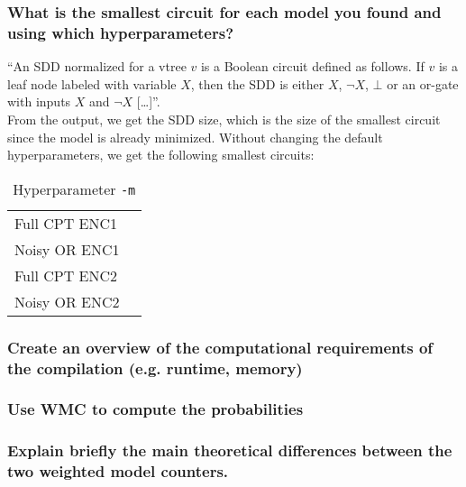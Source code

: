 \documentclass{article}
\begin{document}
\subsubsection{What is the smallest circuit for each model you found and using which hyperparameters?}
``An SDD normalized for a vtree $v$ is a Boolean circuit defined as follows. If $v$ is a leaf node labeled with variable $X$, then the SDD is either $X$, $\neg X$, $\bot$ or an or-gate with inputs $X$ and $\neg X$ [\dots]''\cite{shen}.\\
From the output, we get the SDD size, which is the size of the smallest circuit since the model is already minimized.
Without changing the default hyperparameters, we get the following smallest circuits:
\begin{table}
\centering
\begin{tabular}{l | l}
					&	\\\hline
	Full CPT ENC1	&		\\
	Noisy OR ENC1	&		\\
	Full CPT ENC2	&		\\
	Noisy OR ENC2	&		\\
\end{tabular}
\caption{Hyperparameter \texttt{-m}}
\end{table}

\subsubsection{Create an overview of the computational requirements of the compilation (e.g. runtime, memory)}

\subsubsection{Use WMC to compute the probabilities }
\subsubsection{Explain briefly the main theoretical differences between the two weighted model counters.}





\end{document}
